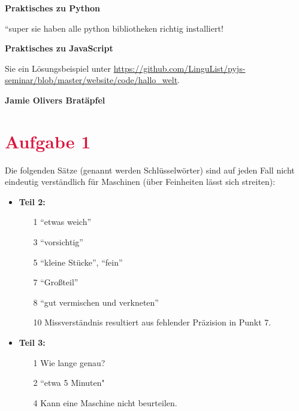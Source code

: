 \documentclass[xetex,svgnames]{scrartcl}
\begin{document}
\begin{center}
  \bf \huge Praktisches zu Python
\end{center}
``super sie haben alle python bibliotheken richtig installiert!

\begin{center}
  \bf \huge Praktisches zu JavaScript
\end{center}
Sie ein Lösungsbeispiel unter
\url{https://github.com/LinguList/pyjs-seminar/blob/master/website/code/hallo_welt}.

\begin{center}
    {\bf \huge  Jamie Olivers Bratäpfel}
\end{center}
\section*{\textcolor{Crimson}{Aufgabe 1} }
Die folgenden Sätze (genannt werden Schlüsselwörter) sind auf jeden Fall nicht eindeutig verständlich für Maschinen (über
Feinheiten lässt sich streiten): 
\begin{itemize}
        \item {\bf Teil 2:} 
            \begin{itemize}
                \item[1] ``etwas weich''
                \item[3] ``vorsichtig''
                \item[5] ``kleine Stücke'', ``fein''
                \item[7] ``Großteil''
                \item[8] ``gut vermischen und verkneten''
                \item[10] Missverständnis resultiert aus fehlender Präzision in
                    Punkt 7.
            \end{itemize}
        \item {\bf Teil 3:}
            \begin{itemize}
                \item[1] Wie lange genau?
                \item[2] ``etwa 5 Minuten"
                \item[4] Kann eine Maschine nicht beurteilen.
            \end{itemize}
    \end{itemize}
\end{document}
